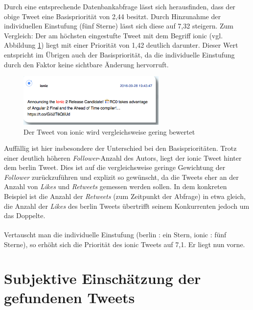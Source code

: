 %
\newpage
Durch eine entsprechende Datenbankabfrage lässt sich herausfinden, dass der obige Tweet eine Basispriorität von 2,44 besitzt. Durch Hinzunahme der individuellen Einstufung (fünf Sterne) lässt sich diese auf 7,32 steigern. Zum Vergleich: Der am höchsten eingestufte Tweet mit dem Begriff \glqq ionic\grqq{} (vgl. Abbildung \ref{fig:tweet_ionic}) liegt mit einer Priorität von 1,42 deutlich darunter. Dieser Wert entspricht im Übrigen auch der Basispriorität, da die individuelle Einstufung durch den Faktor \grqq{} keine sichtbare Änderung hervorruft.
%
\medskip
\begin{figure}[!h]
    \centering
    \includegraphics[width=0.65\textwidth]{Graphics/tweet_ionic}
    \caption[Tweet: Schlüsselwort \glqq ionic\grqq{}]{Der Tweet von \glqq ionic\grqq{} wird vergleichsweise gering bewertet}
   \label{fig:tweet_ionic}
\end{figure}
%
Auffällig ist hier insbesondere der Unterschied bei den Basisprioritäten. Trotz einer deutlich höheren \textit{Follower}-Anzahl des Autors, liegt der \glqq ionic\grqq{} Tweet hinter dem \glqq berlin\grqq{} Tweet. Dies ist auf die vergleichsweise geringe Gewichtung der \textit{Follower} zurückzuführen und explizit so gewünscht, da die Tweets eher an der Anzahl von \textit{Likes} und \textit{Retweets} gemessen werden sollen. In dem konkreten Beispiel ist die Anzahl der \textit{Retweets} (zum Zeitpunkt der Abfrage) in etwa gleich, die Anzahl der \textit{Likes} des \glqq berlin\grqq{} Tweets übertrifft seinem \glqq Konkurrenten\grqq{} jedoch um das Doppelte. \\\\
Vertauscht man die individuelle Einstufung (\glqq berlin\grqq{} : ein Stern, \glqq ionic\grqq{} : fünf Sterne), so erhöht sich die Priorität des \glqq ionic\grqq{} Tweets auf 7,1. Er liegt nun vorne.

\section{Subjektive Einschätzung der gefundenen Tweets}

